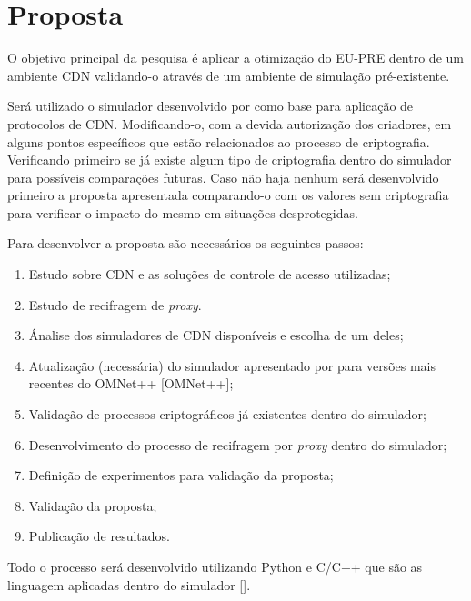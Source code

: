 \section{Proposta}
\label{proposta:metodologia}
O objetivo principal da pesquisa é aplicar a otimização do EU-PRE dentro de um ambiente CDN validando-o através de um ambiente de simulação pré-existente.

Será utilizado o simulador desenvolvido por \cite{stamos2010cdnsim} como base para aplicação de protocolos de CDN. Modificando-o, com a devida autorização dos criadores, em alguns pontos específicos que estão relacionados ao processo de criptografia. Verificando primeiro se já existe algum tipo de criptografia dentro do simulador para possíveis comparações futuras.
Caso não haja nenhum será desenvolvido primeiro a proposta apresentada comparando-o com os valores sem criptografia para verificar o impacto do mesmo em situações desprotegidas.

Para desenvolver a proposta são necessários os seguintes passos:
\begin{enumerate}

    \item \label{proposta:EstudoCDN} Estudo sobre CDN e as soluções de controle de acesso utilizadas;
    \item \label{proposta:EstudoRecifragem} Estudo de recifragem de \emph{proxy}.
    \item \label{proposta:AnaliseSim} Ánalise dos simuladores de CDN disponíveis e escolha de um deles;
    \item \label{proposta:Atualizacao} Atualização (necessária) do simulador apresentado por \cite{stamos2010cdnsim} para versões mais recentes do OMNet++ [OMNet++];
    \item \label{proposta:ValidacaoProcesso} Validação de processos criptográficos já existentes dentro do simulador;
    \item \label{proposta:Desenvolvimento} Desenvolvimento do processo de recifragem por \emph{proxy} dentro do simulador;
    \item \label{proposta:DefExperimentos} Definição de experimentos para validação da proposta;
    \item \label{proposta:ValidacaoProposta} Validação da proposta;
    \item \label{proposta:Publicacao} Publicação de resultados.

\end{enumerate}

Todo o processo será desenvolvido utilizando Python e C/C++ que são as linguagem aplicadas dentro do simulador [\cite{stamos2010cdnsim}].